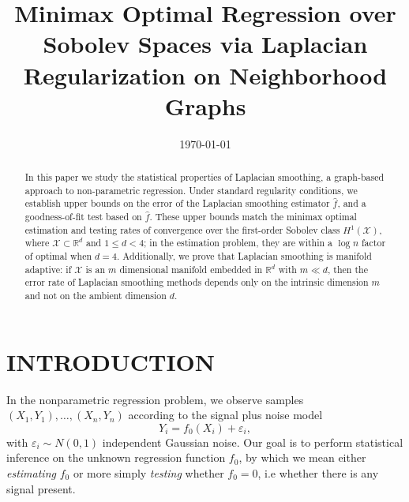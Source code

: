 \documentclass[twoside]{article}
\newcommand{\Reals}{\mathbb{R}}
\newcommand{\1}{\mathbf{1}}
\newcommand{\Rd}{\Reals^d}
\newcommand{\Xset}{\mathcal{X}}
\newcommand{\wh}[1]{\widehat{#1}}
\theoremstyle{definition}
\theoremstyle{remark}
\begin{document}
\title{Minimax Optimal Regression over Sobolev Spaces via Laplacian Regularization on Neighborhood Graphs}
\date{\today}
\maketitle

	

\begin{abstract}
	In this paper we study the statistical properties of Laplacian smoothing, a graph-based approach to non-parametric regression. Under standard regularity conditions, we establish upper bounds on the error of the Laplacian smoothing estimator $\wh{f}$, and a goodness-of-fit test based on $\wh{f}$. These upper bounds match the minimax optimal estimation and testing rates of convergence over the first-order Sobolev class $H^1(\Xset)$, where $\Xset \subset \Rd$ and $1 \leq d < 4$; in the estimation problem, they are within a $\log n$ factor of optimal when $d = 4$. Additionally, we prove that Laplacian smoothing is manifold adaptive: if $\Xset$ is an $m$ dimensional manifold embedded in $\Reals^d$ with $m \ll d$, then the error rate of Laplacian smoothing methods depends only on the intrinsic dimension $m$ and not on the ambient dimension $d$. 
\end{abstract}

\section{INTRODUCTION}
In the nonparametric regression problem, we observe samples $(X_1,Y_1),\ldots,(X_n,Y_n)$ according to the signal plus noise model
\begin{equation}
\label{eqn:signal_plus_noise_model}
Y_i = f_{0}(X_i) + \varepsilon_i,
\end{equation}
with $\varepsilon_i \sim N(0,1)$ independent Gaussian noise. Our goal is to perform statistical inference on the unknown regression function $f_0$, by which we mean either \emph{estimating} $f_0$ or more simply \emph{testing} whether $f_0 = 0$, i.e whether there is any signal present. 
\end{document}
